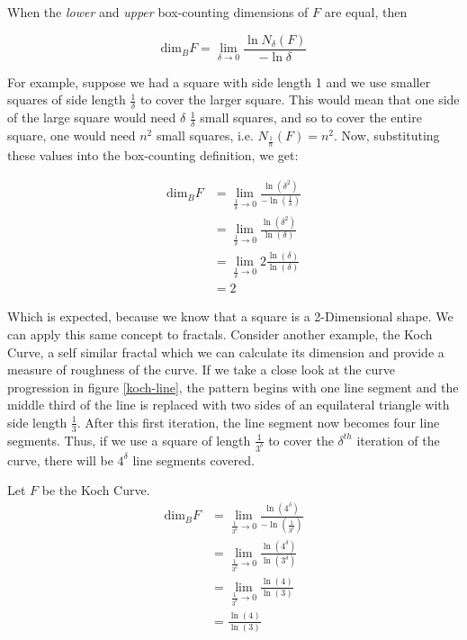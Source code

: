 \documentclass[a4paper,11pt,twoside]{article}
\begin{document}
When the \emph{lower} and \emph{upper} box-counting dimensions of \(F\) are equal, then

\begin{equation*}
\text{dim}_BF = \lim_{\delta \to 0} \frac{\ln N_\delta(F)}{-\ln \delta}
\end{equation*}

For example, suppose we had a square with side length 1 and we use smaller squares of side
length \(\frac{1}{\delta}\) to cover the larger square. This would mean that one side of the
large square would need \(\delta\) \(\frac{1}{\delta}\) small squares, and so to cover
the entire square, one would need \(n^2\) small squares, i.e. \(N_{\frac{1}{n}}(F) = n^2\). Now,
substituting these values into the box-counting definition, we get:

\begin{align*}
\text{dim}_BF &= \lim_{\frac{1}{\delta} \to 0} \frac{\ln(\delta^2)}{-\ln(\frac{1}{\delta})}\\
&= \lim_{\frac{1}{\delta} \to 0} \frac{\ln(\delta^2)}{\ln(\delta)}\\
&= \lim_{\frac{1}{\delta} \to 0} 2\frac{\ln(\delta)}{\ln(\delta)}\\
&= 2
\end{align*}

Which is expected, because we know that a square is a 2-Dimensional shape. We
can apply this same concept to fractals. Consider another example, the Koch
Curve, a self similar fractal which we can calculate its dimension and provide a
measure of roughness of the curve. If we take a close look at the curve progression
in figure \ref{koch-line}, the pattern begins with one line segment and the middle third
of the line is replaced with two sides of an equilateral triangle with side length
\(\frac{1}{3}\). After this first iteration, the line segment now becomes four line
segments. Thus, if we use a square of length \(\frac{1}{3^{\delta}}\) to cover the \(\delta^{th}\)
iteration of the curve, there will be \(4^{\delta}\) line segments covered.

Let \(F\) be the Koch Curve.
\begin{align*}
\text{dim}_BF &= \lim_{\frac{1}{3^{\delta}} \to 0} \frac{\ln(4^{\delta})}{-\ln(\frac{1}{3^{\delta}})}\\
&= \lim_{\frac{1}{3^{\delta}} \to 0} \frac{\ln(4^{\delta})}{\ln(3^{\delta})}\\
&= \lim_{\frac{1}{3^{\delta}} \to 0} \frac{\ln(4)}{\ln(3)}\\
&= \frac{\ln(4)}{\ln(3)}
\end{align*}
\end{document}

